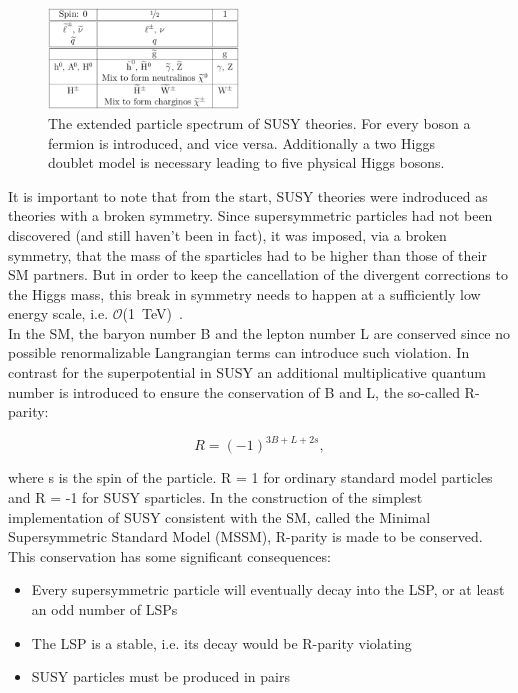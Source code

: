 \begin{figure}[h!t]
  \begin{center}
       \includegraphics[width=0.45\textwidth,]{figures/sparticleTable.png}
       \caption{The extended particle spectrum of SUSY theories. For every boson a fermion
       is introduced, and vice versa. Additionally a two Higgs doublet model is necessary 
       leading to five physical Higgs bosons.}
    \label{tab:sparticleTable}
  \end{center}
\end{figure}

It is important to note that from the start, SUSY theories were indroduced as theories with a 
broken symmetry. Since supersymmetric particles had not been discovered (and still haven't been in fact), 
it was imposed, via a broken symmetry, that the mass of the sparticles had to be higher than 
those of their SM partners. But in order to keep the cancellation of the divergent corrections to 
the Higgs mass, this break in symmetry needs to happen at a sufficiently low energy scale, 
i.e. $\mathcal{O}$(1~TeV)~\cite{ramond1999journeys}.\\
\indent In the SM, the baryon number B and the lepton number L are conserved since no possible 
renormalizable Langrangian terms can introduce such violation. In contrast for the superpotential in 
SUSY an additional multiplicative quantum number is introduced to ensure the conservation of B and L, the so-called R-parity:

\begin{equation}
\label{eq:r-par}
R = \left(-1\right)^{3B+L+2s},
\end{equation}

where s is the spin of the particle. R = 1 for ordinary standard model particles and R = -1 for SUSY sparticles.
In the construction of the simplest implementation of SUSY consistent with the SM, called the Minimal 
Supersymmetric Standard Model (MSSM), R-parity is made to be conserved. This conservation has some significant consequences:

\begin{itemize}
\item{Every supersymmetric particle will eventually decay into the LSP, or at least an odd
number of LSPs}
\item{The LSP is a stable, i.e. its decay would be R-parity violating}
\item{SUSY particles must be produced in pairs}
\end{itemize}


